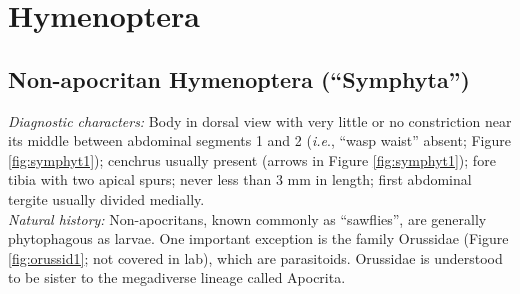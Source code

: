 \documentclass[letterpaper, 11pt]{article}
\begin{document}
\section{Hymenoptera}
\subsection{Non-apocritan Hymenoptera (``Symphyta'')}
\noindent{}\textit{Diagnostic characters:} Body in dorsal view with very little or no constriction near its middle between abdominal segments 1 and 2 (\textit{i.e}., ``wasp waist'' absent; Figure \ref{fig:symphyt1}); cenchrus usually present (arrows in Figure \ref{fig:symphyt1}); fore tibia with two apical spurs; never less than 3 mm in length; first abdominal tergite usually divided medially.\\

\noindent{}\textit{Natural history:} Non-apocritans, known commonly as ``sawflies'', are generally phytophagous as larvae. One important exception is the family Orussidae (Figure \ref{fig:orussid1}; not covered in lab), which are parasitoids. Orussidae is understood to be sister to the megadiverse lineage called Apocrita.
\end{document}

